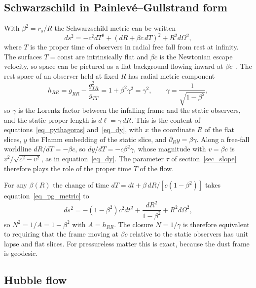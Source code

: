 \documentclass[pdflatex,sn-mathphys-num]{sn-jnl}%
\theoremstyle{thmstyleone}%
\theoremstyle{thmstyletwo}%
\theoremstyle{thmstylethree}%
\begin{document}
\subsection{Schwarzschild in Painlev\'e--Gullstrand form}\label{sec_pg}

With $\beta^2=r_s/R$ the Schwarzschild metric can be written~\cite{Painleve1921,Gullstrand1922,MartelPoisson2001}
\begin{equation}\label{eq_pg_metric}
    ds^2=-c^2dT^2+\left(dR+\beta c\,dT\right)^2+R^2d\Omega^2 ,
\end{equation}
where $T$ is the proper time of observers in radial free fall from rest at infinity. The surfaces $T=\text{const}$ are intrinsically flat and $\beta c$ is the Newtonian escape velocity, so space can be pictured as a flat background flowing inward at $\beta c$~\cite{HamiltonLisle2008}. The rest space of an observer held at fixed $R$ has radial metric component
\begin{equation}\label{eq_hrr_flow}
    h_{RR}=g_{RR}-\frac{g_{TR}^2}{g_{TT}}=1+\beta^2\gamma^2=\gamma^2,
    \qquad\gamma=\frac1{\sqrt{1-\beta^2}},
\end{equation}
so $\gamma$ is the Lorentz factor between the infalling frame and the static observers, and the static proper length is $d\ell=\gamma\,dR$. This is the content of equations~\eqref{eq_pythagoras} and~\eqref{eq_dy}, with $x$ the coordinate $R$ of the flat slices, $y$ the Flamm embedding of the static slice, and $\partial_Ry=\beta\gamma$. Along a free-fall worldline $dR/dT=-\beta c$, so $dy/dT=-c\beta^2\gamma$, whose magnitude with $v=\beta c$ is $v^2/\sqrt{c^2-v^2}$, as in equation~\eqref{eq_dy}. The parameter $\tau$ of section~\ref{sec_slope} therefore plays the role of the proper time $T$ of the flow.

For any $\beta(R)$ the change of time $dT=dt+\beta\,dR/\left[c\left(1-\beta^2\right)\right]$ takes equation~\eqref{eq_pg_metric} to
\begin{equation}
    ds^2=-\left(1-\beta^2\right)c^2dt^2+\frac{dR^2}{1-\beta^2}+R^2d\Omega^2 ,
\end{equation}
so $N^2=1/A=1-\beta^2$ with $A=h_{RR}$. The closure $N=1/\gamma$ is therefore equivalent to requiring that the frame moving at $\beta c$ relative to the static observers has unit lapse and flat slices. For pressureless matter this is exact, because the dust frame is geodesic.

\subsection{Hubble flow}
\end{document}
